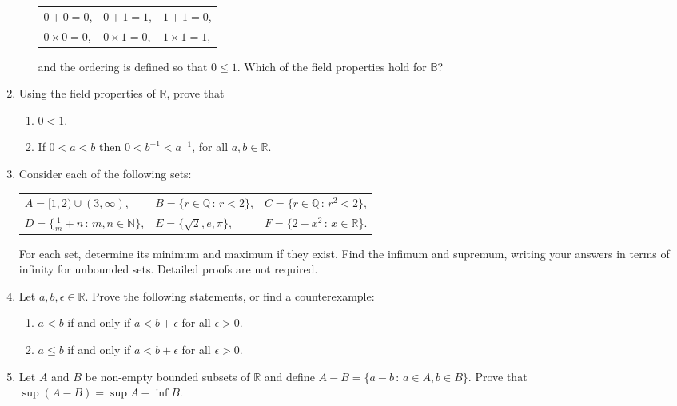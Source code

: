 \documentclass[12pt]{article}
\newcommand{\N}{\mathbb{N}}
\newcommand{\B}{\mathbb{B}}
\newcommand{\Q}{\mathbb{Q}}
\newcommand{\R}{\mathbb{R}}
\newcommand{\sep}{\,:\,}
\begin{document}
\begin{enumerate}
\begin{enumerate}
\begin{center}
\begin{tabular}{lll}
            $0+0=0$,\qquad&$0+1=1$, \qquad &$1+1=0$, \\[0.4em]
            $0\times0 =0$, \qquad&$0\times 1 =0$, \qquad&$1\times 1=1$,
          \end{tabular}
        \end{center}
        and the ordering is defined so that $0\le 1$. Which of the field properties hold for $\B$?
    \end{enumerate}
  \item Using the field properties of $\R$, prove that
    \begin{enumerate}
      \item $0<1$.
      \item If $0<a<b$ then $0<b^{-1}<a^{-1}$, for all $a,b \in \R$.
    \end{enumerate}
  \item Consider each of the following sets:
    \begin{center}
      \begin{tabular}{lll}
        $A=[1,2) \cup (3,\infty)$, \qquad& $B= \{r \in \Q \sep r<2\}$,\qquad& $C=\{r \in \Q \sep r^2<2 \}$, \\[0.4em]
        $D=\{\tfrac{1}{m}+n \sep m,n\in \N\}$, \qquad& $E=\{\sqrt2, e, \pi\}$, \qquad& $F= \{2-x^2 \sep x\in \R$\}.
      \end{tabular}
    \end{center}
    For each set, determine its minimum and maximum if they exist. Find the infimum and supremum, writing your answers in terms of infinity for unbounded sets. Detailed proofs are not required.
  \item Let $a,b, \epsilon\in \R$. Prove the following statements, or find a
    counterexample:
    \begin{enumerate}
      \item $a<b$ if and only if $a<b+\epsilon$ for all $\epsilon>0$.
      \item $a \le b$ if and only if $a<b+\epsilon$ for all $\epsilon>0$.
    \end{enumerate}
  \item Let $A$ and $B$ be non-empty bounded subsets of $\R$ and define $A-B=\{a-b \sep a\in A, b\in B\}$. Prove that $\sup (A-B) = \sup A - \inf B$.


\end{enumerate}
\end{document}
